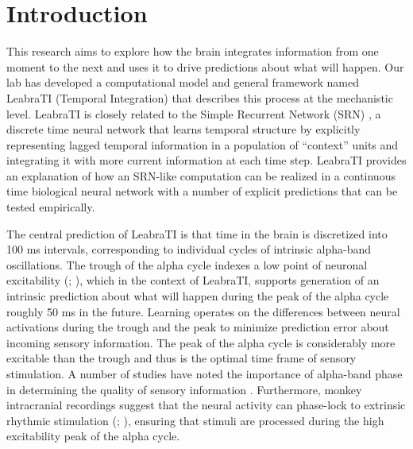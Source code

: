 \documentclass[12pt]{article}
\begin{document}
\section*{Introduction}
This research aims to explore how the brain integrates information from one moment to the next and uses it to drive predictions about what will happen. Our lab has developed a computational model and general framework named LeabraTI (Temporal Integration) that describes this process at the mechanistic level. LeabraTI is closely related to the Simple Recurrent Network (SRN) \cite{Elman90,Servan-SchreiberCleeremansMcClelland91}, a discrete time neural network that learns temporal structure by explicitly representing lagged temporal information in a population of ``context'' units and integrating it with more current information at each time step. LeabraTI provides an explanation of how an SRN-like computation can be realized in a continuous time biological neural network with a number of explicit predictions that can be tested empirically.
	
The central prediction of LeabraTI is that time in the brain is discretized into 100 ms intervals, corresponding to individual cycles of intrinsic alpha-band oscillations. The trough of the alpha cycle indexes a low point of neuronal excitability (; ), which in the context of LeabraTI, supports generation of an intrinsic prediction about what will happen during the peak of the alpha cycle roughly 50 ms in the future. Learning operates on the differences between neural activations during the trough and the peak to minimize prediction error about incoming sensory information. The peak of the alpha cycle is considerably more excitable than the trough and thus is the optimal time frame of sensory stimulation. A number of studies have noted the importance of alpha-band phase in determining the quality of sensory information \cite{MathewsonGrattonFabianiEtAl09,BuschDuboisVanRullen09,VanRullenBuschDrewesEtAl11}. Furthermore, monkey intracranial recordings suggest that the neural activity can phase-lock to extrinsic rhythmic stimulation (; ), ensuring that stimuli are processed during the high excitability peak of the alpha cycle.
\end{document}

